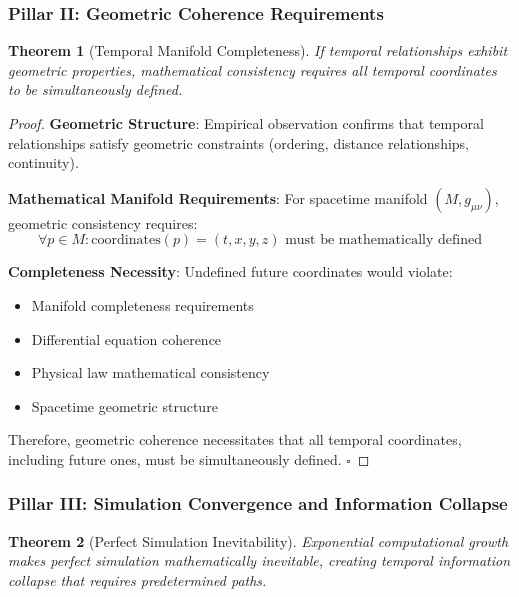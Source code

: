 \documentclass[11pt,a4paper]{article}
\newtheorem{theorem}{Theorem}[section]
\theoremstyle{remark}
\begin{document}
\subsubsection{Pillar II: Geometric Coherence Requirements}

\begin{theorem}[Temporal Manifold Completeness]
If temporal relationships exhibit geometric properties, mathematical consistency requires all temporal coordinates to be simultaneously defined.
\end{theorem}

\begin{proof}
\textbf{Geometric Structure}: Empirical observation confirms that temporal relationships satisfy geometric constraints (ordering, distance relationships, continuity).

\textbf{Mathematical Manifold Requirements}: For spacetime manifold $(M, g_{\mu\nu})$, geometric consistency requires:
\begin{equation}
\forall p \in M: \text{coordinates}(p) = (t, x, y, z) \text{ must be mathematically defined}
\end{equation}

\textbf{Completeness Necessity}: Undefined future coordinates would violate:
\begin{itemize}
\item Manifold completeness requirements
\item Differential equation coherence  
\item Physical law mathematical consistency
\item Spacetime geometric structure
\end{itemize}

Therefore, geometric coherence necessitates that all temporal coordinates, including future ones, must be simultaneously defined. $\square$
\end{proof}

\subsubsection{Pillar III: Simulation Convergence and Information Collapse}

\begin{theorem}[Perfect Simulation Inevitability]
Exponential computational growth makes perfect simulation mathematically inevitable, creating temporal information collapse that requires predetermined paths.
\end{theorem}
\end{document}
